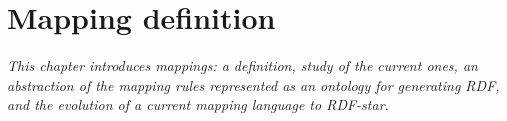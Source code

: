
\chapter{Mapping definition}
\label{chapter:mappings}

\textit{This chapter introduces mappings: a definition, study of the current ones, an abstraction of the mapping rules represented as an ontology for generating RDF, and the evolution of a current mapping language to RDF-star.}







